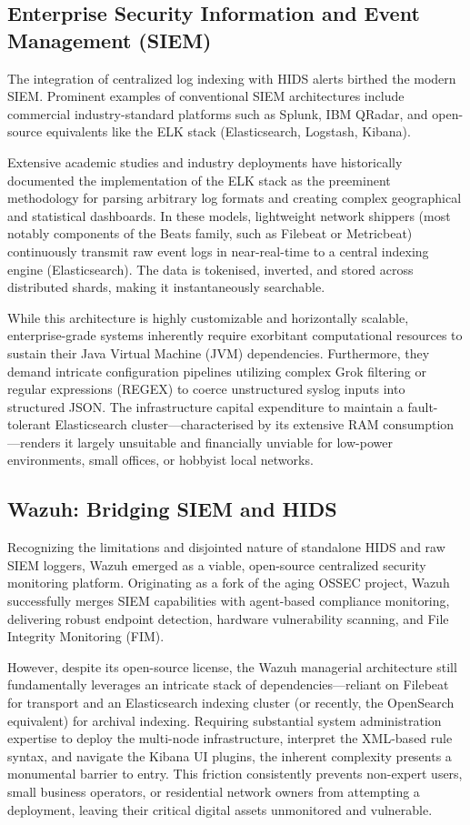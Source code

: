 \subsection{Enterprise Security Information and Event Management (SIEM)}
The integration of centralized log indexing with HIDS alerts birthed the modern SIEM. Prominent examples of conventional SIEM architectures include commercial industry-standard platforms such as Splunk, IBM QRadar, and open-source equivalents like the ELK stack (Elasticsearch, Logstash, Kibana).

Extensive academic studies and industry deployments have historically documented the implementation of the ELK stack as the preeminent methodology for parsing arbitrary log formats and creating complex geographical and statistical dashboards. In these models, lightweight network shippers (most notably components of the Beats family, such as Filebeat or Metricbeat) continuously transmit raw event logs in near-real-time to a central indexing engine (Elasticsearch). The data is tokenised, inverted, and stored across distributed shards, making it instantaneously searchable.

While this architecture is highly customizable and horizontally scalable, enterprise-grade systems inherently require exorbitant computational resources to sustain their Java Virtual Machine (JVM) dependencies. Furthermore, they demand intricate configuration pipelines utilizing complex Grok filtering or regular expressions (REGEX) to coerce unstructured syslog inputs into structured JSON. The infrastructure capital expenditure to maintain a fault-tolerant Elasticsearch cluster—characterised by its extensive RAM consumption—renders it largely unsuitable and financially unviable for low-power environments, small offices, or hobbyist local networks.

\subsection{Wazuh: Bridging SIEM and HIDS}
Recognizing the limitations and disjointed nature of standalone HIDS and raw SIEM loggers, Wazuh emerged as a viable, open-source centralized security monitoring platform. Originating as a fork of the aging OSSEC project, Wazuh successfully merges SIEM capabilities with agent-based compliance monitoring, delivering robust endpoint detection, hardware vulnerability scanning, and File Integrity Monitoring (FIM).

However, despite its open-source license, the Wazuh managerial architecture still fundamentally leverages an intricate stack of dependencies—reliant on Filebeat for transport and an Elasticsearch indexing cluster (or recently, the OpenSearch equivalent) for archival indexing. Requiring substantial system administration expertise to deploy the multi-node infrastructure, interpret the XML-based rule syntax, and navigate the Kibana UI plugins, the inherent complexity presents a monumental barrier to entry. This friction consistently prevents non-expert users, small business operators, or residential network owners from attempting a deployment, leaving their critical digital assets unmonitored and vulnerable.

